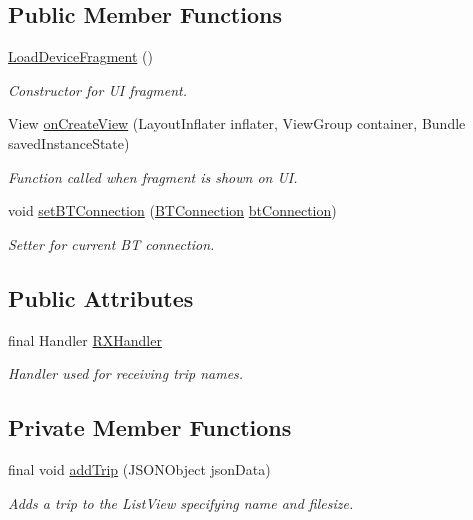 \subsection*{Public Member Functions}
\begin{DoxyCompactItemize}
\item 
\hyperlink{class_android_app_1_1_load_device_fragment_a2a090a4a947fb44a024a1d3c920b3b63}{Load\+Device\+Fragment} ()
\begin{DoxyCompactList}\small\item\em Constructor for UI fragment. \end{DoxyCompactList}\item 
View \hyperlink{class_android_app_1_1_load_device_fragment_af1a028ea902679e9bcc967c1b54b2451}{on\+Create\+View} (Layout\+Inflater inflater, View\+Group container, Bundle saved\+Instance\+State)
\begin{DoxyCompactList}\small\item\em Function called when fragment is shown on UI. \end{DoxyCompactList}\item 
void \hyperlink{class_android_app_1_1_load_device_fragment_a77ce93090f6c8c6aac522e35bfe9d21b}{set\+B\+T\+Connection} (\hyperlink{class_android_app_1_1_b_t_connection}{B\+T\+Connection} \hyperlink{class_android_app_1_1_load_device_fragment_a245147c7d3683cf1556680a382f328a9}{bt\+Connection})
\begin{DoxyCompactList}\small\item\em Setter for current BT connection. \end{DoxyCompactList}\end{DoxyCompactItemize}
\subsection*{Public Attributes}
\begin{DoxyCompactItemize}
\item 
final Handler \hyperlink{class_android_app_1_1_load_device_fragment_ad37565ea5a5332faf0c6b12284ca4e6c}{R\+X\+Handler}
\begin{DoxyCompactList}\small\item\em Handler used for receiving trip names. \end{DoxyCompactList}\end{DoxyCompactItemize}
\subsection*{Private Member Functions}
\begin{DoxyCompactItemize}
\item 
final void \hyperlink{class_android_app_1_1_load_device_fragment_a182949dc35ed68974acf64e20cdc6f20}{add\+Trip} (J\+S\+O\+N\+Object json\+Data)
\begin{DoxyCompactList}\small\item\em Adds a trip to the List\+View specifying name and filesize. \end{DoxyCompactList}\end{DoxyCompactItemize}
